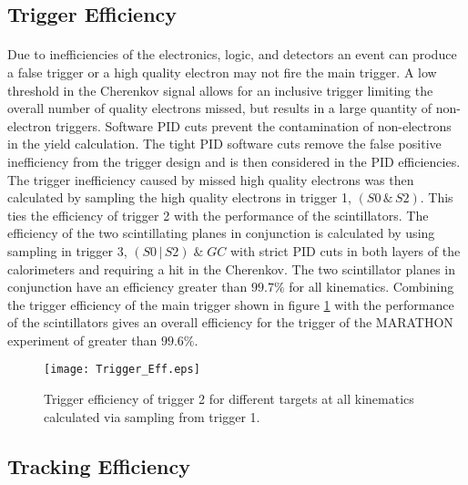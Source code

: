 \subsection{Trigger Efficiency}
\paragraph{}  Due to inefficiencies of the electronics, logic, and detectors an event can produce a false trigger or a high quality electron may not fire the main trigger.
A low threshold in the Cherenkov signal allows for an inclusive trigger limiting the overall number of quality electrons missed, but results in a large quantity of non-electron triggers. Software PID cuts prevent the contamination of non-electrons in the yield calculation. The tight PID software cuts remove the false positive inefficiency from the trigger design and is then considered in the PID efficiencies. The trigger inefficiency caused by missed high quality electrons was then calculated by sampling the high quality electrons in trigger 1, $(S0\, \&\, S2)$. This ties the efficiency of trigger 2 with the performance of the scintillators. The efficiency of the two scintillating planes in conjunction is calculated by using sampling in trigger 3, $(S0\, |\, S2)\; \&\; GC$ with strict PID cuts in both layers of the calorimeters and requiring a hit in the Cherenkov. The two scintillator planes in conjunction have an efficiency greater than $99.7 \% $ for all kinematics. Combining the trigger efficiency of the main trigger shown in figure \ref{trigeff} with the performance of the scintillators gives an overall efficiency for the trigger of the MARATHON experiment of greater than $99.6\%$.
\begin{figure}[t]
	\centering
	\texttt{[image: Trigger\_Eff.eps]}
	\caption{Trigger efficiency of trigger 2 for different targets at all kinematics calculated via sampling from trigger 1. }
	\label{trigeff}
\end{figure}
\subsection{Tracking Efficiency}\label{eff_track}

